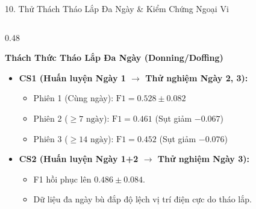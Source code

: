 \documentclass[aspectratio=169,10pt]{beamer}
\begin{document}
\begin{frame}{10. Thử Thách Tháo Lắp Đa Ngày \& Kiểm Chứng Ngoại Vi}
    \begin{columns}[T]
        \begin{column}{0.48\textwidth}
            \begin{alertblock}{\textbf{Thách Thức Tháo Lắp Đa Ngày (Donning/Doffing)}}
                \scriptsize
                \begin{itemize}
                    \item \textbf{CS1 (Huấn luyện Ngày 1 $\to$ Thử nghiệm Ngày 2, 3):}
                    \begin{itemize}
                        \item Phiên 1 (Cùng ngày): $\text{F1} = 0.528 \pm 0.082$
                        \item Phiên 2 ($\ge 7\text{ ngày}$): $\text{F1} = 0.461$ (Sụt giảm $-0.067$)
                        \item Phiên 3 ($\ge 14\text{ ngày}$): $\text{F1} = 0.452$ (Sụt giảm $-0.076$)
                    \end{itemize}
                    \item \textbf{CS2 (Huấn luyện Ngày 1+2 $\to$ Thử nghiệm Ngày 3):}
                    \begin{itemize}
                        \item F1 hồi phục lên $\mathbf{0.486 \pm 0.084}$.
                        \item Dữ liệu đa ngày bù đắp độ lệch vị trí điện cực do tháo lắp.
                    \end{itemize}
                \end{itemize}
            \end{alertblock}
        \end{column}
        

\end{columns}
\end{frame}
\end{document}

